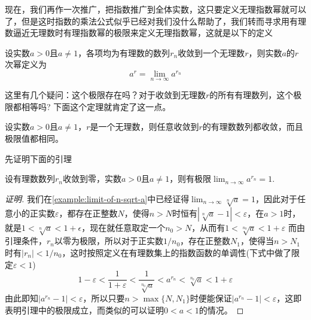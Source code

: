 现在，我们再作一次推广，把指数推广到全体实数，这只要定义无理指数幂就可以了，但是这时指数的乘法公式似乎已经对我们没什么帮助了，我们转而寻求用有理数逼近无理数时有理指数幂的极限来定义无理指数幂，这就是以下的定义
\begin{definition}
  设实数$a>0$且$a \neq 1$，各项均为有理数的数列$r_n$收敛到一个无理数$r$，则实数$a$的$r$次幂定义为
  \[ a^r = \lim_{n \to \infty} a^{r_n} \]
\end{definition}

这里有几个疑问：这个极限存在吗？对于收敛到无理数$r$的所有有理数列，这个极限都相等吗? 下面这个定理就肯定了这一点。
\begin{theorem}
  设实数$a>0$且$a \neq 1$，$r$是一个无理数，则任意收敛到$r$的有理数数列都收敛，而且极限值都相同。
\end{theorem}

先证明下面的引理
\begin{lemma}
  \label{lemma:a-power-rn-to-1-when-rational-rn-to-0}
  设有理数数列$r_n$收敛到零，实数$a>0$且$a \neq 1$，则有极限$\lim_{n \to \infty} a^{r_n} = 1$.
\end{lemma}

\begin{proof}[证明]
  我们在\autoref{example:limit-of-n-sqrt-a}中已经证得$\lim_{n \to \infty} \sqrt[n]{a} = 1$，因此对于任意小的正实数$\varepsilon$，都存在正整数$N$，使得$n>N$时恒有$|\sqrt[n]{a}-1|<\varepsilon$，在$a>1$时，就是$1<\sqrt[n]{a}<1+\epsilon$，现在就任意取定一个$n_0>N$，从而有$1<\sqrt[n_0]{a}<1+\varepsilon$ 而由引理条件，$r_n$以零为极限，所以对于正实数$1/n_0$，存在正整数$N_1$，使得当$n>N_1$时有$|r_n|<1/n_0$，这时按照定义在有理数集上的指数函数的单调性(下式中做了限定$\varepsilon<1$)
  \[ 1-\varepsilon<\frac{1}{1+\varepsilon}<\frac{1}{\sqrt[n_0]{a}}<a^{r_n}<\sqrt[n_0]{a}<1+\varepsilon \]
  由此即知$|a^{r_n}-1|<\varepsilon$，所以只要$n>\max\{N, N_1\}$时便能保证$|a^{r_n}-1|<\varepsilon$，这即表明引理中的极限成立，而类似的可以证明$0<a<1$的情况。
\end{proof}

